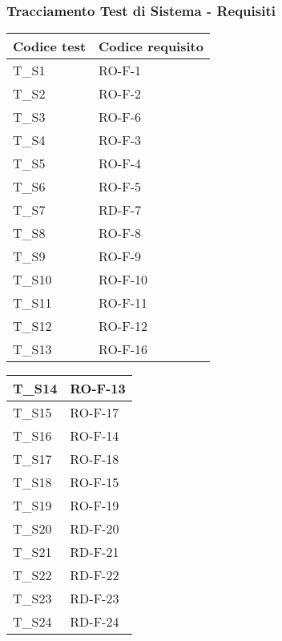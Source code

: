 \subsubsection{Tracciamento Test di Sistema - Requisiti}
\begin{center}
    \renewcommand{\arraystretch}{1.8}
    \begin{tabular}{|m{6em}|m{8em}|}
        \hline
        \textbf{Codice test} & \textbf{Codice requisito}\\
        \hline
        T\_S1 & RO-F-1\\
        \hline
        T\_S2 & RO-F-2\\
        \hline
        T\_S3 & RO-F-6\\
        \hline
        T\_S4 & RO-F-3\\
        \hline
        T\_S5 & RO-F-4\\
        \hline
        T\_S6 & RO-F-5\\
        \hline
        T\_S7 & RD-F-7\\
        \hline
        T\_S8 & RO-F-8\\
        \hline
        T\_S9 & RO-F-9\\
        \hline
        T\_S10 & RO-F-10\\
        \hline
        T\_S11 & RO-F-11\\
        \hline
        T\_S12 & RO-F-12\\
        \hline
        T\_S13 & RO-F-16\\
        \hline
    \end{tabular}
    \newpage
    \renewcommand{\arraystretch}{1.8}
    \begin{tabular}{|m{6em}|m{8em}|}
        \hline
        T\_S14 & RO-F-13\\
        \hline
        T\_S15 & RO-F-17\\
        \hline
        T\_S16 & RO-F-14\\
        \hline
        T\_S17 & RO-F-18\\
        \hline
        T\_S18 & RO-F-15\\
        \hline
        T\_S19 & RO-F-19\\
        \hline
        T\_S20 & RD-F-20\\
        \hline
        T\_S21 & RD-F-21\\
        \hline
        T\_S22 & RD-F-22\\
        \hline
        T\_S23 & RD-F-23\\
        \hline
        T\_S24 & RD-F-24\\

\end{tabular}
\end{center}
